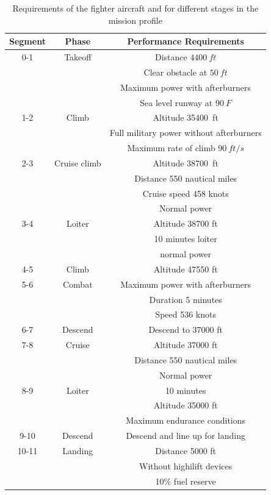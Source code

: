 \documentclass[pdftex,11pt,letter]{article}
\begin{document}
\begin{table}[h]
\caption{Requirements of the fighter aircraft and for different stages in the mission profile}
\centering 
\begin{tabular}{c| c| c}
\hline\hline
{Segment} & Phase       & Performance Requirements \\
\hline\hline
0-1 	& Takeoff 	& Distance $4400~ft$ \\
	&		& Clear obstacle at $50~ft$\\
	& 		& Maximum power with afterburners\\
	&		& Sea level runway at $90~F$\\\hline
1-2	& Climb		& Altitude 35400~ft \\
	& 		& Full military power without afterburners\\
	&		& Maximum rate of climb $90~ft/s$\\
\hline
2-3 	& Cruise climb	& Altitude 38700~ft \\
	&		& Distance 550 nautical miles \\
	&		& Cruise speed 458 knots\\
	&		& Normal power \\
\hline
3-4 	& Loiter	& Altitude 38700 ft\\
	&		& 10 minutes loiter \\
	& 		& normal power\\
\hline
4-5	& Climb		& Altitude 47550 ft\\
\hline
5-6	& Combat 	& Maximum power with afterburners \\
	&		& Duration 5 minutes \\
	& 		& Speed 536 knots \\
\hline
6-7	& Descend 	& Descend to 37000 ft\\
\hline
7-8	& Cruise 	& Altitude 37000 ft\\
	& 		& Distance 550 nautical miles\\
	&		& Normal power\\
\hline
8-9	& Loiter	& 10 minutes  \\	
	& 		& Altitude 35000 ft\\
	&		& Maximum endurance conditions \\
\hline
9-10	& Descend 	& Descend and line up for landing\\
\hline
10-11	& Landing	& Distance 5000 ft \\
	&		& Without highilift devices\\	
	&		& 10$\%$ fuel reserve\\
\hline\hline
\end{tabular}
\label{tab:requirements}
\end{table}
\end{document}
